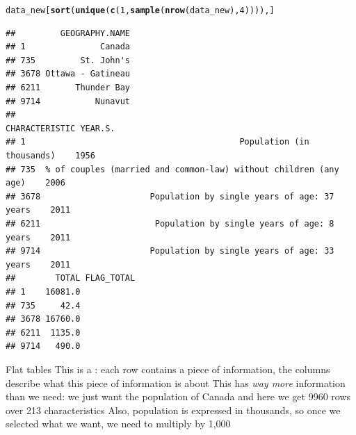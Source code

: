 \documentclass[aspectratio=169]{beamer}\usepackage[]{graphicx}\usepackage[]{xcolor}
\makeatletter
\newcommand{\hlnum}[1]{\textcolor[rgb]{0.686,0.059,0.569}{#1}}%
\newcommand{\hlsng}[1]{\textcolor[rgb]{0.192,0.494,0.8}{#1}}%
\newcommand{\hlopt}[1]{\textcolor[rgb]{0,0,0}{#1}}%
\newcommand{\hldef}[1]{\textcolor[rgb]{0.345,0.345,0.345}{#1}}%
\newcommand{\hlkwb}[1]{\textcolor[rgb]{0.69,0.353,0.396}{#1}}%
\newcommand{\hlkwd}[1]{\textcolor[rgb]{0.737,0.353,0.396}{\textbf{#1}}}%
\newenvironment{kframe}{%
 \def\at@end@of@kframe{}%
 \ifinner\ifhmode%
  \def\at@end@of@kframe{\end{minipage}}%
  \begin{minipage}{\columnwidth}%
 \fi\fi%
 \def\FrameCommand##1{\hskip\@totalleftmargin \hskip-\fboxsep
 \colorbox{shadecolor}{##1}\hskip-\fboxsep
     \hskip-\linewidth \hskip-\@totalleftmargin \hskip\columnwidth}%
 \MakeFramed {\advance\hsize-\width
   \@totalleftmargin\z@ \linewidth\hsize
   \@setminipage}}%
 {\par\unskip\endMakeFramed%
 \at@end@of@kframe}
\newenvironment{knitrout}{}{} %
\makeatother
\begin{document}
\begin{frame}[fragile]
\begin{knitrout}
\color{fgcolor}\begin{kframe}
\begin{alltt}
\hldef{data_new[}\hlkwd{sort}\hldef{(}\hlkwd{unique}\hldef{(}\hlkwd{c}\hldef{(}\hlnum{1}\hldef{,}\hlkwd{sample}\hldef{(}\hlkwd{nrow}\hldef{(data_new),} \hlnum{4}\hldef{)))), ]}
\end{alltt}
\begin{verbatim}
##         GEOGRAPHY.NAME
## 1               Canada
## 735         St. John's
## 3678 Ottawa - Gatineau
## 6211       Thunder Bay
## 9714           Nunavut
##                                                        CHARACTERISTIC YEAR.S.
## 1                                           Population (in thousands)    1956
## 735  % of couples (married and common-law) without children (any age)    2006
## 3678                      Population by single years of age: 37 years    2011
## 6211                       Population by single years of age: 8 years    2011
## 9714                      Population by single years of age: 33 years    2011
##        TOTAL FLAG_TOTAL
## 1    16081.0           
## 735     42.4           
## 3678 16760.0           
## 6211  1135.0           
## 9714   490.0
\end{verbatim}
\end{kframe}
\end{knitrout}
\end{frame}


\begin{frame}{Flat tables}
This is a : each row contains a piece of information, the columns describe what this piece of information is about
\vfill
This has \emph{way more} information than we need: we just want the population of Canada and here we get 9960 rows over 213 characteristics
\vfill
Also, population is expressed in thousands, so once we selected what we want, we need to multiply by 1,000
\end{frame}

\end{document}
